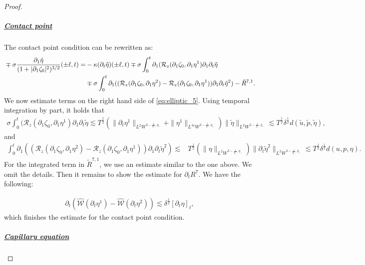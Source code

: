 \documentclass[letterpaper,reqno,10pt,twoside]{amsart}
\theoremstyle{definition}
\theoremstyle{remark}
\def\p{\partial}
\def\no{\nonumber}
\begin{document}
\begin{proof}
			\subparagraph{\underline{Contact point}}
			
			The contact point condition can be rewritten as:
			\begin{align}{\label{eq:elliptic_5}}
				\mp\sigma\frac{\p_1\tilde{\eta}}{(1+|\p_1\zeta_0|^2)^{3/2}}(\pm\ell,t)=&-\kappa(\p_{t}\tilde{\eta})(\pm\ell,t)\mp\sigma\int_{0}^{t}\p_{1}(\mathcal{R}_{z}(\p_{1}\zeta_{0},\p_{1}\eta^{1})\p_{1}\p_{t}\tilde{\eta}\\ &\mp\sigma\int_{0}^{t}\p_{1}((\mathcal{R}_{z}(\p_{1}\zeta_{0},\p_{1}\eta^{2})-\mathcal{R}_{z}(\p_{1}\zeta_{0},\p_{1}\eta^{1}))\p_{1}\p_{t}\tilde{\eta}^{2})-\tilde R^{7,1}.\no
			\end{align}
			We now estimate terms on the right hand side of \eqref{eq:elliptic_5}. Using temporal integration by part, it holds that
			\begin{align}
				\sigma\int_{0}^{t}(\mathcal{R}_{z}(\p_{1}\zeta_{0},\p_{1}\eta^{1})\p_{1}\p_{t}\tilde{\eta}\lesssim T^{\frac{1}{2}}(\|\p_{t}\eta^{1}\|_{L^{2}W^{3-\frac{1}{q_{-}},q_{-}}}+\|\eta^{1}\|_{L^{\infty}W^{3-\frac{1}{q_{-}},q_{-}}})\|\tilde{\eta}\|_{L^{2}W^{3-\frac{1}{q_{-}},q_{-}}}\lesssim T^{\frac{1}{2}}\delta^{\frac{1}{2}}d(\tilde{u},\tilde{p},\tilde{\eta}),
			\end{align}
			\noindent and
			\begin{align}
				\int_{0}^{t}\p_{1}((\mathcal{R}_{z}(\p_{1}\zeta_{0},\p_{1}\eta^{2})-\mathcal{R}_{z}(\p_{1}\zeta_{0},\p_{1}\eta^{1}))\p_{1}\p_{t}\tilde{\eta}^{2})\lesssim &T^{\frac{1}{2}}(\|\eta\|_{L^{2}W^{3-\frac{1}{q_{-}},q_{-}}})\|\p_{t}\tilde{\eta}^{2}\|_{L^{2}W^{3-\frac{1}{q_{-}},q_{-}}}
				\lesssim T^{\frac{1}{2}}\delta^{\frac{1}{2}}d({u},{p},{\eta}).
			\end{align}
			\noindent For the integrated term in $\tilde{R}^{7,1}$, we use an estimate similar  to the one above. We omit the details. Then it remains to show the estimate for $\p_{t}R^{7}$. We have the following:
			
			\begin{align}
				\p_{t}(\hat{\mathcal{W}}(\p_{t}\eta^{1})-\hat{\mathcal{W}}(\p_{t}\eta^{2}))\lesssim \delta^{\frac{1}{2}}[\p_{t}\eta]_{\ell},
			\end{align}
			\noindent which finishes the estimate for the contact point condition.
			
			\subparagraph{\underline{Capillary equation}}
			

\end{proof}
\end{document}
